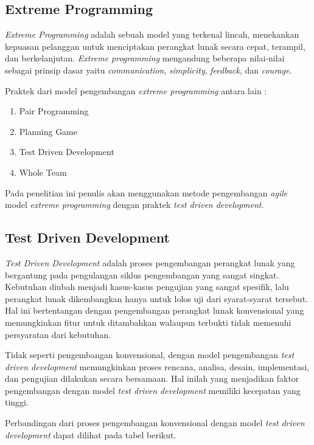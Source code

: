 \begin{spacing}{2}
  \subsection{Extreme Programming}
    \emph{Extreme Programming} adalah sebuah model yang terkenal lincah, menekankan kepuasan pelanggan untuk menciptakan perangkat lunak secara cepat, terampil, dan berkelanjutan. \emph{Extreme programming} mengandung beberapa nilai-nilai sebagai prinsip dasar yaitu \emph{communication}, \emph{simplicity}, \emph{feedback}, dan \emph{courage}.

    Praktek dari model pengembangan \emph{extreme programming} antara lain :
    \begin{enumerate}
      \item Pair Programming
      \item Planning Game
      \item Test Driven Development
      \item Whole Team
    \end{enumerate}

    Pada penelitian ini penulis akan menggunakan metode pengembangan \emph{agile} model \emph{extreme programming} dengan praktek \emph{test driven development}.

  \subsection{Test Driven Development}
    \emph{Test Driven Development} adalah proses pengembangan perangkat lunak yang bergantung pada pengulangan siklus pengembangan yang sangat singkat. Kebutuhan diubah menjadi kasus-kasus pengujian yang sangat spesifik, lalu perangkat lunak dikembangkan hanya untuk lolos uji dari syarat-syarat tersebut. Hal ini bertentangan dengan pengembangan perangkat lunak konvensional yang memungkinkan fitur untuk ditambahkan walaupun terbukti tidak memenuhi persyaratan dari kebutuhan.

    Tidak seperti pengembangan konvensional, dengan model pengembangan \emph{test driven development} memungkinkan proses rencana, analisa, desain, implementasi, dan pengujian dilakukan secara bersamaan. Hal inilah yang menjadikan faktor pengembangan dengan model \emph{test driven development} memiliki kecepatan yang tinggi.

    Perbandingan dari proses pengembangan konvensional dengan model \emph{test driven development} dapat dilihat pada tabel berikut.


\end{spacing}
